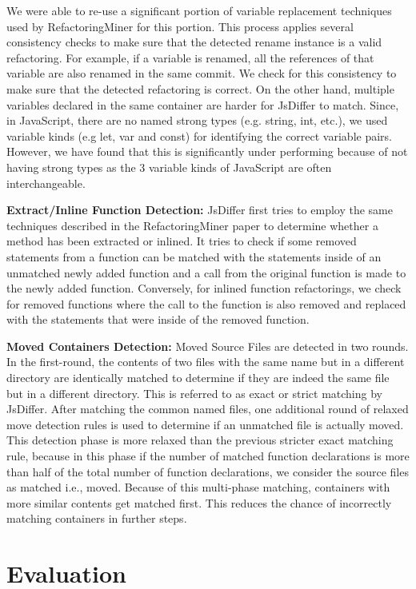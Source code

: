 \documentclass[letterpaper,12pt,onecolumn,final]{report}
\begin{document}
We were able to re-use a significant portion of variable replacement techniques used by RefactoringMiner for this portion. This process applies several consistency checks to make sure that the detected rename instance is a valid refactoring. For example, if a variable is renamed, all the references of that variable are also renamed in the same commit. We check for this consistency to make sure that the detected refactoring is correct. On the other hand, multiple variables declared in the same container are harder for JsDiffer to match. Since, in JavaScript, there are no named strong types (e.g. string, int, etc.), we used variable kinds (e.g let, var and const) for identifying the correct variable pairs. However, we have found that this is significantly under performing because of not having strong types as the 3 variable kinds of JavaScript are often interchangeable.

\textbf{Extract/Inline Function Detection:} JsDiffer first tries to employ the same techniques described in the RefactoringMiner paper to determine whether a method has been extracted or inlined. It tries to check if some removed statements from a function can be matched with the statements inside of an unmatched newly added function and a call from the original function is made to the newly added function. Conversely, for inlined function refactorings, we check for removed functions where the call to the function is also removed and replaced with the statements that were inside of the removed function.

\textbf{Moved Containers Detection:} Moved Source Files are detected in two rounds. In the first-round, the contents of two files with the same name but in a different directory are identically matched to determine if they are indeed the same file but in a different directory. This is referred to as exact or strict matching by JsDiffer. After matching the common named files, one additional round of relaxed move detection rules is used to determine if an unmatched file is actually moved. This detection phase is more relaxed than the previous stricter exact matching rule, because in this phase if the number of matched function declarations is more than half of the total number of function declarations, we consider the source files as matched i.e., moved. Because of this multi-phase matching, containers with more similar contents get matched first. This reduces the chance of incorrectly matching containers in further steps.

\chapter{Evaluation}
\end{document}
